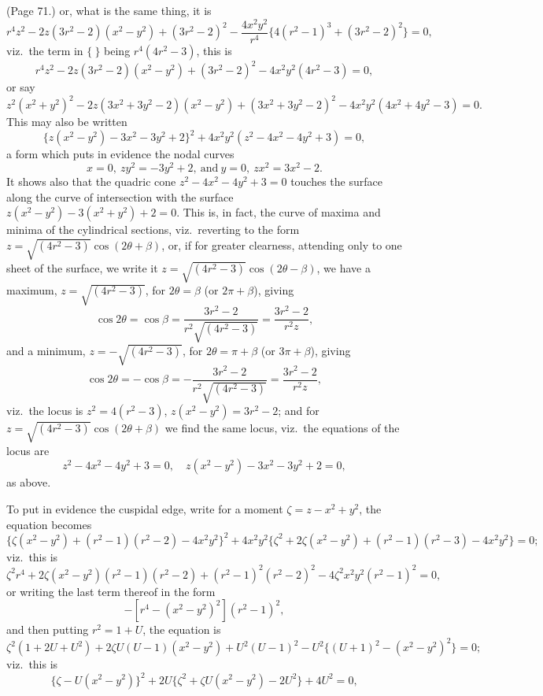 \documentclass[11pt,a4paper]{article}
\begin{document}
\noindent (Page 71.) or, what is the same thing, it is
\[
r^4 z^2 - 2z(3r^2 - 2)(x^2 - y^2) + (3r^2 - 2)^2 - \frac{4x^2 y^2}{r^4} \{4(r^2 - 1)^3 + (3r^2 - 2)^2\} = 0,
\]
viz.\ the term in $\{\ \}$ being $r^4 (4r^2 - 3)$, this is
\[
r^4 z^2 - 2z(3r^2 - 2)(x^2 - y^2) + (3r^2 - 2)^2 - 4x^2 y^2 (4r^2 - 3) = 0,
\]
or say
\[
z^2 (x^2 + y^2)^2 - 2z(3x^2 + 3y^2 - 2)(x^2 - y^2) + (3x^2 + 3y^2 - 2)^2 - 4x^2 y^2 (4x^2 + 4y^2 - 3) = 0.
\]
This may also be written
\[
\{z(x^2 - y^2) - 3x^2 - 3y^2 + 2\}^2 + 4x^2 y^2 (z^2 - 4x^2 - 4y^2 + 3) = 0,
\]
a form which puts in evidence the nodal curves
\[
x = 0,\ zy^2 = -3y^2 + 2,\ \text{and}\ y = 0,\ zx^2 = 3x^2 - 2.
\]
It shows also that the quadric cone $z^2 - 4x^2 - 4y^2 + 3 = 0$ touches the surface along the curve of intersection with the surface $z(x^2 - y^2) - 3(x^2 + y^2) + 2 = 0$. This is, in fact, the curve of maxima and minima of the cylindrical sections, viz.\ reverting to the form $z = \sqrt{(4r^2 - 3)} \cos(2\theta + \beta)$, or, if for greater clearness, attending only to one sheet of the surface, we write it $z = \sqrt{(4r^2 - 3)} \cos(2\theta - \beta)$, we have a maximum, $z = \sqrt{(4r^2 - 3)}$, for $2\theta = \beta$ (or $2\pi + \beta$), giving
\[
\cos 2\theta = \cos\beta = \frac{3r^2 - 2}{r^2 \sqrt{(4r^2 - 3)}} = \frac{3r^2 - 2}{r^2 z},
\]
and a minimum, $z = -\sqrt{(4r^2 - 3)}$, for $2\theta = \pi + \beta$ (or $3\pi + \beta$), giving
\[
\cos 2\theta = -\cos\beta = -\frac{3r^2 - 2}{r^2 \sqrt{(4r^2 - 3)}} = \frac{3r^2 - 2}{r^2 z},
\]
viz.\ the locus is $z^2 = 4(r^2 - 3)$, $z(x^2 - y^2) = 3r^2 - 2$; and for $z = \sqrt{(4r^2 - 3)} \cos(2\theta + \beta)$ we find the same locus, viz.\ the equations of the locus are
\[
z^2 - 4x^2 - 4y^2 + 3 = 0,\quad z(x^2 - y^2) - 3x^2 - 3y^2 + 2 = 0,
\]
as above.

To put in evidence the cuspidal edge, write for a moment $\zeta = z - x^2 + y^2$, the equation becomes
\[
\{\zeta(x^2 - y^2) + (r^2 - 1)(r^2 - 2) - 4x^2 y^2\}^2 + 4x^2 y^2 \{\zeta^2 + 2\zeta (x^2 - y^2) + (r^2 - 1)(r^2 - 3) - 4x^2 y^2\} = 0;
\]
viz.\ this is
\[
\zeta^2 r^4 + 2\zeta(x^2 - y^2)(r^2 - 1)(r^2 - 2) + (r^2 - 1)^2 (r^2 - 2)^2 - 4\zeta^2 x^2 y^2 (r^2 - 1)^2 = 0,
\]
or writing the last term thereof in the form
\[
-[r^4 - (x^2 - y^2)^2](r^2 - 1)^2,
\]
and then putting $r^2 = 1 + U$, the equation is
\[
\zeta^2 (1 + 2U + U^2) + 2\zeta U(U - 1)(x^2 - y^2) + U^2 (U - 1)^2 - U^2 \{(U + 1)^2 - (x^2 - y^2)^2\} = 0;
\]
viz.\ this is
\[
\{\zeta - U(x^2 - y^2)\}^2 + 2U\{\zeta^2 + \zeta U(x^2 - y^2) - 2U^2\} + 4U^2 = 0,
\]

\bigskip
\end{document}
